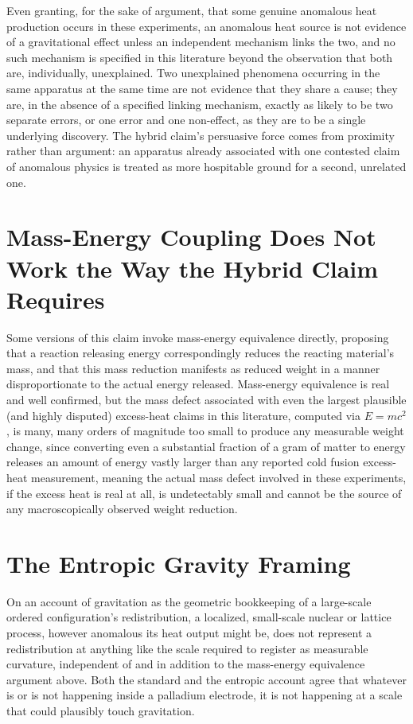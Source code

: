 \documentclass[11pt]{article}
\begin{document}
Even granting, for the sake of argument, that some genuine anomalous heat production occurs in these experiments, an anomalous heat source is not evidence of a gravitational effect unless an independent mechanism links the two, and no such mechanism is specified in this literature beyond the observation that both are, individually, unexplained. Two unexplained phenomena occurring in the same apparatus at the same time are not evidence that they share a cause; they are, in the absence of a specified linking mechanism, exactly as likely to be two separate errors, or one error and one non-effect, as they are to be a single underlying discovery. The hybrid claim's persuasive force comes from proximity rather than argument: an apparatus already associated with one contested claim of anomalous physics is treated as more hospitable ground for a second, unrelated one.

\section{Mass-Energy Coupling Does Not Work the Way the Hybrid Claim Requires}

Some versions of this claim invoke mass-energy equivalence directly, proposing that a reaction releasing energy correspondingly reduces the reacting material's mass, and that this mass reduction manifests as reduced weight in a manner disproportionate to the actual energy released. Mass-energy equivalence is real and well confirmed, but the mass defect associated with even the largest plausible (and highly disputed) excess-heat claims in this literature, computed via $E=mc^2$, is many, many orders of magnitude too small to produce any measurable weight change, since converting even a substantial fraction of a gram of matter to energy releases an amount of energy vastly larger than any reported cold fusion excess-heat measurement, meaning the actual mass defect involved in these experiments, if the excess heat is real at all, is undetectably small and cannot be the source of any macroscopically observed weight reduction.

\section{The Entropic Gravity Framing}

On an account of gravitation as the geometric bookkeeping of a large-scale ordered configuration's redistribution, a localized, small-scale nuclear or lattice process, however anomalous its heat output might be, does not represent a redistribution at anything like the scale required to register as measurable curvature, independent of and in addition to the mass-energy equivalence argument above. Both the standard and the entropic account agree that whatever is or is not happening inside a palladium electrode, it is not happening at a scale that could plausibly touch gravitation.
\end{document}

